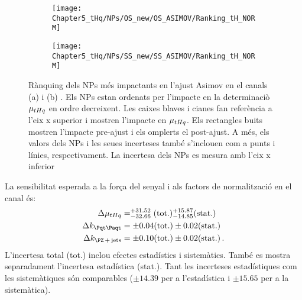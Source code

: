 \begin{figure}[h]
\centering
\begin{subfigure}{.5\textwidth}
  \centering
  \texttt{[image: Chapter5\_tHq/NPs/OS\_new/OS\_ASIMOV/Ranking\_tH\_NORM]}
  \caption{}
\end{subfigure}%
\hfill
\begin{subfigure}{.5\textwidth}
  \centering
  \texttt{[image: Chapter5\_tHq/NPs/SS\_new/SS\_ASIMOV/Ranking\_tH\_NORM]}
  \caption{}
\end{subfigure}%
\caption{Rànquing dels NPs més impactants en l'ajust Asimov en el canals (a) \dilepOStau i (b) \dilepSStau. 
Els NPs estan ordenats per l'impacte en la determinaciò $\mu_{tHq}$ en ordre decreixent. 
Les caixes blaves i cianes fan referència a l'eix x superior i mostren l'impacte en $\mu_{tHq}$. 
Els rectangles buits mostren l'impacte pre-ajust i els omplerts el post-ajust.
 A més, els valors dels NPs i les seues incerteses també s'inclouen com a punts i línies, respectivament. 
 La incertesa dels NPs es mesura amb l'eix x inferior} 
\label{fig:resum:ASIMOV:rank}
\end{figure}



La sensibilitat esperada a la força del senyal i als factors de normalització en el canal \dilepOStau és:
\begin{align}
	\Delta \mu_{\tHq} 	&= ^{+31.52}_{-32.66} (\text{tot.}) ^{+15.87}_{-14.85} (\text{stat.}) \label{eq:resum:ASIMOV:OS:POIs:mu} \\
	\Delta k_{\ttbar} 	&= \pm 0.04 (\text{tot.}) \pm 0.02 (\text{stat.})\label{eq:resum:ASIMOV:OS:POIs:ktt} \\
	\Delta k_{\Zjets} 	&= \pm 0.10 (\text{tot.}) \pm 0.02 (\text{stat.}) \label{eq:resum:ASIMOV:OS:POIs:kzj} \, .
\end{align}
L'incertesa total (tot.) inclou efectes estadístics i sistemàtics.
També es mostra separadament l'incertesa estadística (stat.).
Tant les incerteses estadístiques com les sistemàtiques són comparables
($\pm14.39$ per a l'estadística i $\pm15.65$ per a la sistemàtica).




